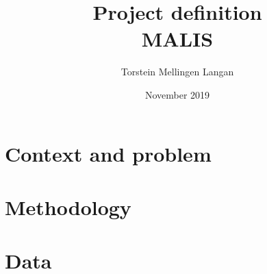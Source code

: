 \documentclass{article}
\title{Project definition\\MALIS}
\author{Torstein Mellingen Langan}
\date{November 2019}
\begin{document}
\maketitle

\section*{Context and problem}
\label{sec:context_and_problem}


\section*{Methodology}
\label{sec:methodology}


\section*{Data}
\label{sec:data}


{}

\end{document}
